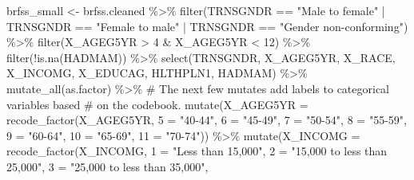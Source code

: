 \documentclass[
  letterpaper,
  DIV=11,
  numbers=noendperiod]{scrreprt}
\newenvironment{Shaded}{\begin{snugshade}}{\end{snugshade}}
\newcommand{\AttributeTok}[1]{\textcolor[rgb]{0.40,0.45,0.13}{#1}}
\newcommand{\CommentTok}[1]{\textcolor[rgb]{0.37,0.37,0.37}{#1}}
\newcommand{\DecValTok}[1]{\textcolor[rgb]{0.68,0.00,0.00}{#1}}
\newcommand{\FunctionTok}[1]{\textcolor[rgb]{0.28,0.35,0.67}{#1}}
\newcommand{\NormalTok}[1]{\textcolor[rgb]{0.00,0.23,0.31}{#1}}
\newcommand{\OtherTok}[1]{\textcolor[rgb]{0.00,0.23,0.31}{#1}}
\newcommand{\SpecialCharTok}[1]{\textcolor[rgb]{0.37,0.37,0.37}{#1}}
\newcommand{\StringTok}[1]{\textcolor[rgb]{0.13,0.47,0.30}{#1}}
\begin{document}
\begin{itemize}
\begin{Shaded}
\begin{Highlighting}[]
\NormalTok{brfss\_small }\OtherTok{\textless{}{-}}\NormalTok{ brfss.cleaned }\SpecialCharTok{\%\textgreater{}\%}
    \FunctionTok{filter}\NormalTok{(TRNSGNDR }\SpecialCharTok{==} \StringTok{"Male to female"} \SpecialCharTok{|}\NormalTok{ TRNSGNDR }\SpecialCharTok{==} \StringTok{"Female to male"} \SpecialCharTok{|}
\NormalTok{        TRNSGNDR }\SpecialCharTok{==} \StringTok{"Gender non{-}conforming"}\NormalTok{) }\SpecialCharTok{\%\textgreater{}\%}
    \FunctionTok{filter}\NormalTok{(X\_AGEG5YR }\SpecialCharTok{\textgreater{}} \DecValTok{4} \SpecialCharTok{\&}\NormalTok{ X\_AGEG5YR }\SpecialCharTok{\textless{}} \DecValTok{12}\NormalTok{) }\SpecialCharTok{\%\textgreater{}\%}
    \FunctionTok{filter}\NormalTok{(}\SpecialCharTok{!}\FunctionTok{is.na}\NormalTok{(HADMAM)) }\SpecialCharTok{\%\textgreater{}\%}
    \FunctionTok{select}\NormalTok{(TRNSGNDR, X\_AGEG5YR, X\_RACE, X\_INCOMG, X\_EDUCAG, HLTHPLN1, HADMAM) }\SpecialCharTok{\%\textgreater{}\%}
    \FunctionTok{mutate\_all}\NormalTok{(as.factor) }\SpecialCharTok{\%\textgreater{}\%}
    \CommentTok{\# The next few mutates add labels to categorical variables based}
    \CommentTok{\# on the codebook.}
\FunctionTok{mutate}\NormalTok{(}\AttributeTok{X\_AGEG5YR =} \FunctionTok{recode\_factor}\NormalTok{(X\_AGEG5YR, }\StringTok{\textasciigrave{}}\AttributeTok{5}\StringTok{\textasciigrave{}} \OtherTok{=} \StringTok{"40{-}44"}\NormalTok{, }\StringTok{\textasciigrave{}}\AttributeTok{6}\StringTok{\textasciigrave{}} \OtherTok{=} \StringTok{"45{-}49"}\NormalTok{,}
    \StringTok{\textasciigrave{}}\AttributeTok{7}\StringTok{\textasciigrave{}} \OtherTok{=} \StringTok{"50{-}54"}\NormalTok{, }\StringTok{\textasciigrave{}}\AttributeTok{8}\StringTok{\textasciigrave{}} \OtherTok{=} \StringTok{"55{-}59"}\NormalTok{, }\StringTok{\textasciigrave{}}\AttributeTok{9}\StringTok{\textasciigrave{}} \OtherTok{=} \StringTok{"60{-}64"}\NormalTok{, }\StringTok{\textasciigrave{}}\AttributeTok{10}\StringTok{\textasciigrave{}} \OtherTok{=} \StringTok{"65{-}69"}\NormalTok{, }\StringTok{\textasciigrave{}}\AttributeTok{11}\StringTok{\textasciigrave{}} \OtherTok{=} \StringTok{"70{-}74"}\NormalTok{)) }\SpecialCharTok{\%\textgreater{}\%}
    \FunctionTok{mutate}\NormalTok{(}\AttributeTok{X\_INCOMG =} \FunctionTok{recode\_factor}\NormalTok{(X\_INCOMG, }\StringTok{\textasciigrave{}}\AttributeTok{1}\StringTok{\textasciigrave{}} \OtherTok{=} \StringTok{"Less than 15,000"}\NormalTok{,}
        \StringTok{\textasciigrave{}}\AttributeTok{2}\StringTok{\textasciigrave{}} \OtherTok{=} \StringTok{"15,000 to less than 25,000"}\NormalTok{, }\StringTok{\textasciigrave{}}\AttributeTok{3}\StringTok{\textasciigrave{}} \OtherTok{=} \StringTok{"25,000 to less than 35,000"}\NormalTok{,}

\end{Highlighting}
\end{Shaded}
\end{itemize}
\end{document}
